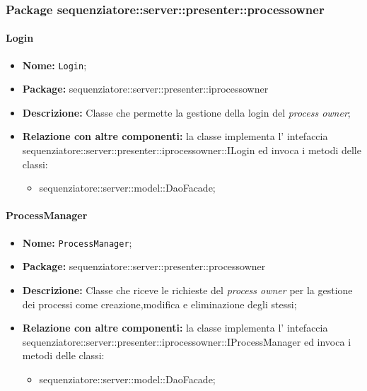 \subsubsection{Package sequenziatore::server::presenter::processowner}
\paragraph{Login}
	\begin{itemize}
		\item \textbf{Nome:} \texttt{Login};
		\item \textbf{Package:} sequenziatore::server::presenter::iprocessowner
		\item \textbf{Descrizione:} Classe che permette la gestione della login del \textit{process owner};
		\item \textbf{Relazione con altre componenti:} la classe implementa l' intefaccia sequenziatore::server::presenter::iprocessowner::ILogin ed invoca i metodi delle classi:
		\begin{itemize}
			\item sequenziatore::server::model::DaoFacade;
		\end{itemize}
	\end{itemize}

\paragraph{ProcessManager}
	\begin{itemize}
		\item \textbf{Nome:} \texttt{ProcessManager};
		\item \textbf{Package:} sequenziatore::server::presenter::processowner
		\item \textbf{Descrizione:} Classe che riceve le richieste del \textit{process owner} per la gestione dei processi come creazione,modifica e eliminazione degli stessi;
		\item \textbf{Relazione con altre componenti:} la classe implementa l' intefaccia sequenziatore::server::presenter::iprocessowner::IProcessManager ed invoca i metodi delle classi:
		\begin{itemize}
			\item sequenziatore::server::model::DaoFacade;
		\end{itemize}
	\end{itemize}

